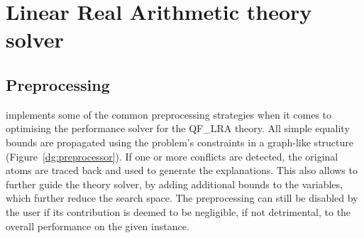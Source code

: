 \documentclass[runningheads]{llncs}
\begin{document}
\section{Linear Real Arithmetic theory solver}
\label{sec:lra-theory-solver}

\subsection*{Preprocessing}

\dlinear implements some of the common preprocessing strategies when it comes to optimising the performance solver for the QF\_LRA theory.
All simple equality bounds are propagated using the problem's constraints in a graph-like structure (Figure~\ref{dg:preprocessor}).
If one or more conflicts are detected, the original atoms are traced back and used to generate the explanations.
This also allows to further guide the theory solver, by adding additional bounds to the variables, which further reduce the search space.
The preprocessing can still be disabled by the user if its contribution is deemed to be negligible, if not detrimental, to the overall performance on the given instance.
\end{document}
